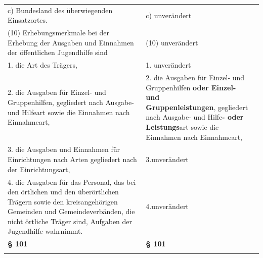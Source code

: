 \documentclass[10pt,a4paper,landscape]{article}
\begin{document}
\begin{longtable}{|L{8.2cm}|L{8.2cm}|L{8.2cm}|}
\hhline{|---|}
c)   \newline Bundesland des überwiegenden  \newline Einsatzortes. & c) unverändert &  \\
\hhline{|---|}
(10) Erhebungsmerkmale bei der Erhebung  \newline der Ausgaben und Einnahmen der  \newline öffentlichen Jugendhilfe sind & (10) unverändert &  \\
\hhline{|---|}
1.   \newline die Art des Trägers, & 1. unverändert &  \\
\hhline{|---|}
2.   \newline die Ausgaben für Einzel- und  \newline Gruppenhilfen, gegliedert nach Ausgabe-  \newline und Hilfeart sowie die Einnahmen nach  \newline Einnahmeart, & 2.   \newline die Ausgaben für Einzel- und  \newline Gruppenhilfen \textbf{\textcolor{diffred}{oder Einzel- und  \newline Gruppenleistungen}}, gegliedert nach  \newline Ausgabe- und Hilfe\textbf{\textcolor{diffred}{- oder}} \textbf{\textcolor{diffred}{Leistungs}}art  \newline sowie die Einnahmen nach Einnahmeart, &  \\
\hhline{|---|}
3.   \newline die Ausgaben und Einnahmen für  \newline Einrichtungen nach Arten gegliedert nach  \newline der Einrichtungsart, & 3.unverändert &  \\
\hhline{|---|}
4.   \newline die Ausgaben für das Personal, das bei  \newline den örtlichen und den überörtlichen  \newline Trägern sowie den kreisangehörigen  \newline Gemeinden und Gemeindeverbänden, die  \newline nicht örtliche Träger sind, Aufgaben der  \newline Jugendhilfe wahrnimmt. & 4.unverändert &  \\
\hhline{|---|}
\textbf{\S{} 101} & \textbf{\S{} 101} &  \\
\hhline{|---|}

\end{longtable}
\end{document}
